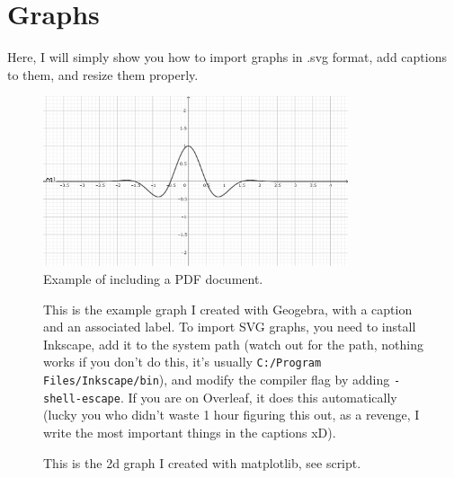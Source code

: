 \chapter{Graphs}
Here, I will simply show you how to import graphs in .svg format, add captions to them, and resize them properly.

\begin{figure}[!ht]
  \centering
  \includegraphics[width=0.8\textwidth]{svg-inkscape/esempio_geogebra_svg-raw.pdf}
  \caption{Example of including a PDF document.}
  \label{fig:pdf-example}
\end{figure}


\begin{figure}[!ht]
	\centering
	
	\caption{This is the example graph I created with Geogebra, with a caption and an associated label. To import SVG graphs, you need to install Inkscape, add it to the system path (watch out for the path, nothing works if you don’t do this, it’s usually \texttt{C:/Program Files/Inkscape/bin}), and modify the compiler flag by adding \texttt{-shell-escape}. If you are on Overleaf, it does this automatically (lucky you who didn’t waste 1 hour figuring this out, as a revenge, I write the most important things in the captions xD).}
	\label{graph:esempiografico}
\end{figure}

\hfill

\begin{figure}[!ht]
	\centering
	
	\caption{This is the 2d graph I created with matplotlib, see script.}
	\label{graph:esempiograficopy}
\end{figure}

\hfill

